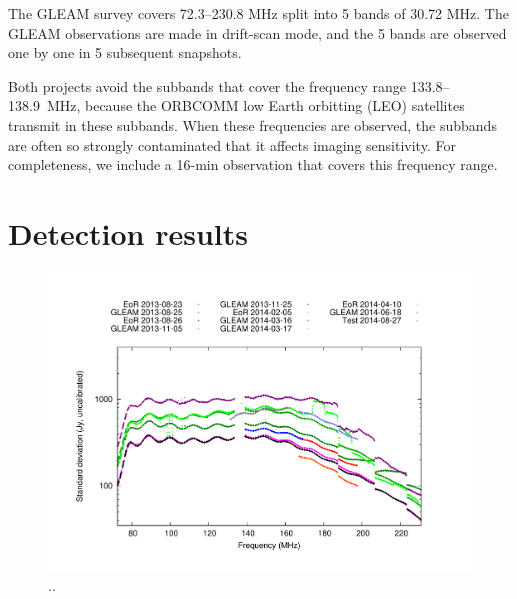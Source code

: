 \documentclass[useAMS,usenatbib]{mn2e}
\begin{document}
The GLEAM survey covers 72.3--230.8 MHz split into 5 bands of 30.72 MHz. The GLEAM observations are made in drift-scan mode, and the 5 bands are observed one by one in 5 subsequent snapshots.

Both projects avoid the subbands that cover the frequency range 133.8--138.9~MHz, because the ORBCOMM low Earth orbitting (LEO) satellites transmit in these subbands. When these frequencies are observed, the subbands are often so strongly contaminated that it affects imaging sensitivity. For completeness, we include a 16-min observation that covers this frequency range.

\section{Detection results}

\noindent\begin{figure}
\begin{center}\hspace*{-0.2cm}\includegraphics[width=18cm]{img/plot-stddev-per-set}\vspace{-1cm}
\caption{..}
\label{fig:stddev-per-set}
\end{center}
\end{figure}
\end{document}
